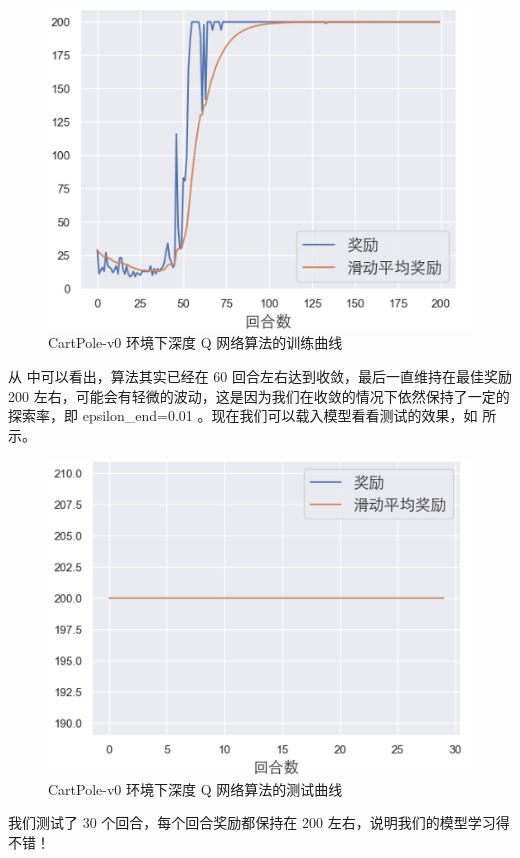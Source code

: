 \begin{figure}[htb]
    \centering
    \includegraphics[width=0.6\linewidth]{res/ch7/assets/train_rewards_curve_cn-1689150.png}
    \caption{CartPole-v0 环境下深度 Q 网络算法的训练曲线}
    \label{fig:train_rewards_curve_cn-1689150.png}
\end{figure}

从 中可以看出，算法其实已经在 60 回合左右达到收敛，最后一直维持在最佳奖励 200 左右，可能会有轻微的波动，这是因为我们在收敛的情况下依然保持了一定的探索率，即 epsilon\_end=0.01 。现在我们可以载入模型看看测试的效果，如 所示。

\begin{figure}[htb]
    \centering
    \includegraphics[width=0.6\linewidth]{res/ch7/assets/eval_rewards_curve_cn-1689282.png}
    \caption{CartPole-v0 环境下深度 Q 网络算法的测试曲线}
    \label{fig:eval_rewards_curve_cn-1689282.png}
\end{figure}

我们测试了 30 个回合，每个回合奖励都保持在 200 左右，说明我们的模型学习得不错！
